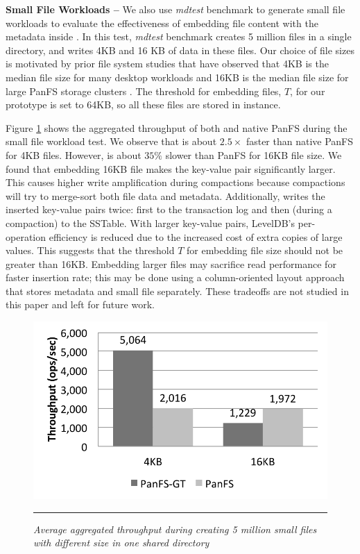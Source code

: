\textbf{Small File Workloads -- }
We also use {\it mdtest} benchmark to generate small file workloads to evaluate
the effectiveness of embedding file content with the metadata inside \tfs.
In this test, {\it mdtest} benchmark creates 5 million files in 
a single directory, and writes 4KB and 16 KB of data in these files. Our choice
of file sizes is motivated by prior file system studies that have observed
that 4KB is the median file size for many desktop workloads \cite{Bill11}
and 16KB is the median file size for large PanFS storage clusters \cite{brent13}.
The threshold for embedding files, $T$, for our prototype is set to 64KB, so all 
these files are stored in \tfs instance.

Figure \ref{graph:smallfiles} shows the aggregated throughput of both \psys and
native PanFS during the small file workload test.
We observe that \psys is about $2.5\times$ faster than native PanFS for 4KB
files.
However, \psys is about $35\%$ slower than PanFS for 16KB file size.
We found that embedding 16KB file makes the key-value pair significantly larger.
This causes higher write amplification during \ldb compactions because
\ldb compactions will try to merge-sort both file data and metadata.
Additionally, \ldb writes the inserted key-value pairs twice: first
to the transaction log and then (during a compaction) to the SSTable.
With larger key-value pairs, LevelDB's per-operation efficiency is reduced due
to the increased cost of extra copies of large values.
This suggests that the threshold $T$ for embedding file size should not be
greater than 16KB. Embedding larger files may sacrifice read performance for
faster insertion rate; this may be done using a column-oriented layout approach 
that stores metadata and small file separately.
These tradeoffs are not studied in this paper and left for future work.

\begin{figure}[t]  %
\centerline{\includegraphics[scale=0.7]{./figs/small_file_creates}}
\vspace{10pt}
\caption{
\textit{Average aggregated throughput during creating 5 million small files
with different size in one shared directory}
}
\hrule
\label{graph:smallfiles}
\end{figure}       %


